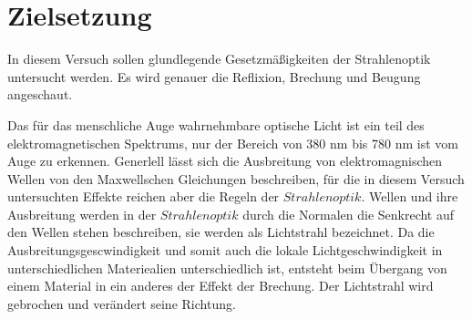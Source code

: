 \section{Zielsetzung}

    \noindent In diesem Versuch sollen glundlegende Gesetzmäßigkeiten der Strahlenoptik untersucht werden.
    Es wird genauer die Reflixion, Brechung und Beugung angeschaut.


    Das für das menschliche Auge wahrnehmbare optische Licht ist ein teil des elektromagnetischen Spektrums, nur der Bereich von 380 nm bis 780 
    nm ist vom Auge zu erkennen. Generlell lässt sich die Ausbreitung von elektromagnischen Wellen von den Maxwellschen Gleichungen beschreiben, 
    für die in diesem Versuch untersuchten Effekte reichen aber die Regeln der $Strahlenoptik$. Wellen und ihre Ausbreitung werden in der 
    $Strahlenoptik$ durch die Normalen die Senkrecht auf den Wellen stehen beschreiben, sie werden als Lichtstrahl bezeichnet. Da die 
    Ausbreitungsgescwindigkeit und somit auch die lokale Lichtgeschwindigkeit in unterschiedlichen Materiealien unterschiedlich ist, entsteht beim 
    Übergang von einem Material in ein anderes der Effekt der Brechung. Der Lichtstrahl wird gebrochen und verändert seine Richtung.